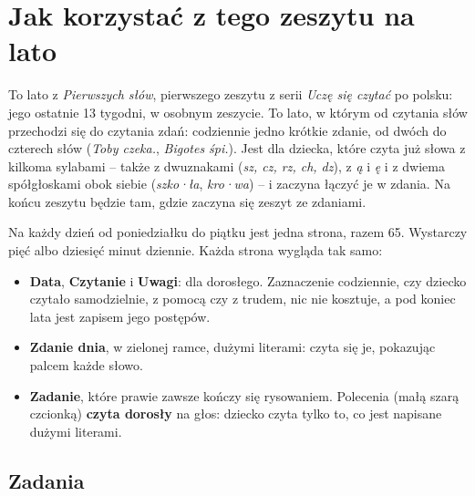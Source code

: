 \section*{Jak korzystać z tego zeszytu na lato}

To lato z \emph{Pierwszych słów}, pierwszego zeszytu z serii
\emph{Uczę się czytać} po polsku: jego ostatnie 13 tygodni, w osobnym
zeszycie. To lato, w którym od czytania słów przechodzi się do czytania
zdań: codziennie jedno krótkie zdanie, od dwóch do czterech słów
(\emph{Toby czeka.}, \emph{Bigotes śpi.}). Jest dla dziecka, które
czyta już słowa z kilkoma sylabami -- także z dwuznakami (\emph{sz, cz,
rz, ch, dz}), z \emph{ą} i \emph{ę} i z dwiema spółgłoskami obok siebie
(\emph{szko·ła}, \emph{kro·wa}) -- i zaczyna łączyć je w zdania. Na
końcu zeszytu będzie tam, gdzie zaczyna się zeszyt ze zdaniami.

Na każdy dzień od poniedziałku do piątku jest jedna strona, razem 65.
Wystarczy pięć albo dziesięć minut dziennie. Każda strona wygląda tak
samo:

\begin{itemize}[leftmargin=6mm]
\item \textbf{Data}, \textbf{Czytanie} i \textbf{Uwagi}: dla dorosłego.
  Zaznaczenie codziennie, czy dziecko czytało samodzielnie, z pomocą czy
  z trudem, nic nie kosztuje, a pod koniec lata jest zapisem jego
  postępów.
\item \textbf{Zdanie dnia}, w zielonej ramce, dużymi literami: czyta się
  je, pokazując palcem każde słowo.
\item \textbf{Zadanie}, które prawie zawsze kończy się rysowaniem.
  Polecenia (małą szarą czcionką) \textbf{czyta dorosły} na głos:
  dziecko czyta tylko to, co jest napisane dużymi literami.
\end{itemize}

\subsection*{Zadania}

